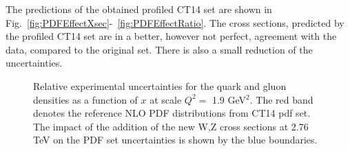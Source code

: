 The predictions of the obtained profiled CT14 set are shown in Fig.~\ref{fig:PDFEffectXsec}-~\ref{fig:PDFEffectRatio}. The cross sections, predicted by the profiled CT14 set are in a better, however not perfect, agreement with the data, compared to the original set. There is also a small reduction of the uncertainties.

\begin{figure}[!tbp]
\begin{minipage}[h]{0.4\linewidth}
\end{minipage}
\hfill
\begin{minipage}[h]{0.4\linewidth}
\end{minipage}
\vfill
\begin{minipage}[h]{0.4\linewidth}
\end{minipage}
\hfill
\begin{minipage}[h]{0.4\linewidth}
\end{minipage}
\vfill
\begin{minipage}[h]{0.4\linewidth}
\end{minipage}
\hfill
\begin{minipage}[h]{0.4\linewidth}
\end{minipage}
\caption{Relative experimental uncertainties for the quark and gluon densities as a function of $x$ at scale $Q^2=$ 1.9 GeV$^2$. The red band denotes the reference NLO PDF distributions from CT14 pdf set. The impact of the addition of the new W,Z cross sections at 2.76 TeV on the PDF set uncertainties is shown by the blue boundaries.}
\label{fig:PDFSensitStrange}
\end{figure}

